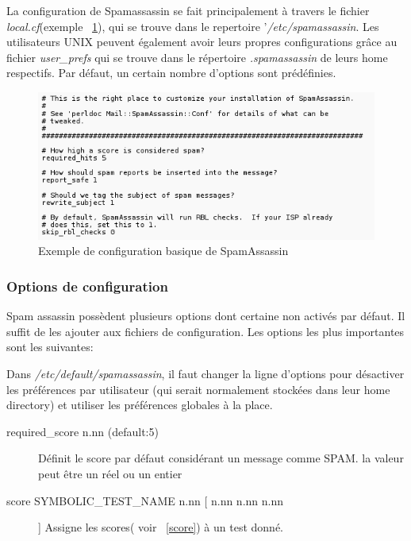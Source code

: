 \documentclass[a4paper,11pt]{article}
\begin{document}
La configuration de Spamassassin se fait principalement à travers le fichier \emph{local.cf}(exemple ~\ref{fig:local_sample}), qui se trouve dans le 
repertoire '\emph{/etc/spamassassin}.
Les utilisateurs UNIX peuvent également avoir leurs propres configurations grâce au fichier \emph{user\_prefs}
qui se trouve dans le répertoire \emph{.spamassassin} de leurs home respectifs. 
Par défaut, un certain nombre d’options sont prédéfinies. 

\begin{figure}[h]
 \centering
 \includegraphics[width=\textwidth]{./annexes/local_sample.png}
 \caption{Exemple de configuration basique de SpamAssassin}
 \label{fig:local_sample}
\end{figure}


\subsubsection{Options de configuration}

Spam assassin possèdent plusieurs options dont certaine non activés par défaut. Il suffit de les ajouter aux fichiers 
de configuration.
Les options les plus importantes sont les suivantes:

\begin{description}
 \item [Désactiver les préférences utilisateurs]Dans \emph{/etc/default/spamassassin}, il faut changer la ligne d'options pour désactiver les préférences par utilisateur (qui serait normalement stockées dans leur home directory) et utiliser les préférences globales à la place. 
 \item [Options de score] \begin{description}
                           \item [required\_score n.nn (default:5)] Définit le score par défaut considérant un message comme SPAM. la valeur peut être un réel ou un entier
                           \item [score SYMBOLIC\_TEST\_NAME n.nn [ n.nn n.nn n.nn ]] Assigne les scores( voir ~\ref{score}) à un test donné.
                          \end{description}
\item 

\end{description}
\label{baye_conf}
\end{document}

